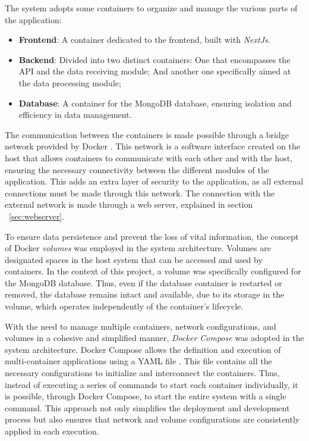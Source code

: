 The system adopts some containers to organize and manage the various parts of the application:
\begin{itemize}
    \item \textbf{Frontend}: A container dedicated to the frontend, built with \textit{NextJs}.
    \item \textbf{Backend}: Divided into two distinct containers:
	\subitem One that encompasses the \gls{API} and the data receiving module;
	\subitem And another one specifically aimed at the data processing module;
    \item \textbf{Database}: A container for the MongoDB database, ensuring isolation and efficiency in data management.
\end{itemize}

The communication between the containers is made possible through a bridge network provided by Docker \cite{dockerNetwork}. This network is a software interface created on the host that allows containers to communicate with each other and with the host, ensuring the necessary connectivity between the different modules of the application. This adds an extra layer of security to the application, as all external connections must be made through this network. The connection with the external network is made through a web server, explained in section ~\ref{sec:webserver}.

To ensure data persistence and prevent the loss of vital information, the concept of Docker \textit{volumes} \cite{dockerVolumes} was employed in the system architecture. Volumes are designated spaces in the host system that can be accessed and used by containers. In the context of this project, a volume was specifically configured for the MongoDB database. Thus, even if the database container is restarted or removed, the database remains intact and available, due to its storage in the volume, which operates independently of the container's lifecycle.

With the need to manage multiple containers, network configurations, and volumes in a cohesive and simplified manner, \textit{Docker Compose} \cite{dockerCompose} was adopted in the system architecture. Docker Compose allows the definition and execution of multi-container applications using a YAML file \cite{yamlOrg}. This file contains all the necessary configurations to initialize and interconnect the containers. Thus, instead of executing a series of commands to start each container individually, it is possible, through Docker Compose, to start the entire system with a single command. This approach not only simplifies the deployment and development process but also ensures that network and volume configurations are consistently applied in each execution.

